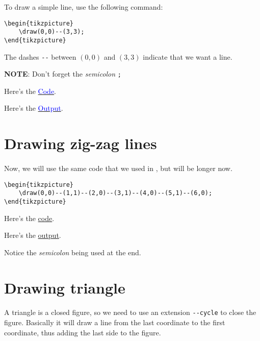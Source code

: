 \documentclass{book}
\newcommand{\bold}[1]{\textbf{#1}}
\newcommand{\italic}[1]{\textit{#1}}
\begin{document}
To draw a simple line, use the following command:

\begin{lstlisting}[frame=tlBR]
\begin{tikzpicture}
	\draw(0,0)--(3,3);
\end{tikzpicture}
\end{lstlisting}

The dashes \lstinline|--| between $(0,0)$ and $(3,3)$ indicate that we want a line.

\bold{NOTE}: Don't forget the \italic{semicolon} \lstinline|;|

Here's the \href{https://github.com/0x50-0x42/latex/blob/LaTeX/Tikz/codes/simpleLine.tex}{\textcolor{blue}{Code}}.

Here's the \href{https://github.com/0x50-0x42/latex/blob/LaTeX/Tikz/codes/simpleLine.pdf}{\textcolor{blue}{Output}}.

\section{Drawing zig-zag lines}
\paragraph{}

Now, we will use the same code that we used in \bold{}, but will be longer now.

\begin{lstlisting}[frame=tlBR]
\begin{tikzpicture}
	\draw(0,0)--(1,1)--(2,0)--(3,1)--(4,0)--(5,1)--(6,0);
\end{tikzpicture}
\end{lstlisting}

Here's the \href{https://github.com/0x50-0x42/latex/blob/LaTeX/Tikz/codes/zig_zag.tex}{code}.

Here's the \href{https://github.com/0x50-0x42/latex/blob/LaTeX/Tikz/codes/zig_zag.pdf}{output}.

Notice the \emph{semicolon} being used at the end.

\section{Drawing triangle}
\paragraph{}

A triangle is a closed figure, so we need to use an extension \lstinline|--cycle| to close the figure. Basically it will draw a line from the last coordinate to the first coordinate, thus adding the last side to the figure.
\end{document}
